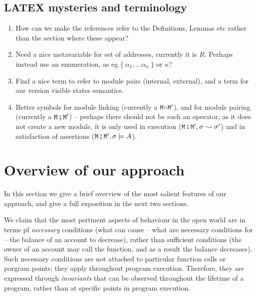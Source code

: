  \subsection*{LATEX mysteries and terminology}
 \begin{enumerate}
 \item
 How can we make the references refer to the Definitions, Lemmas etc rather than the section where these appear?
 \item
 Need a nice metavariable for set of addresses, currently it is $R$. Perhaps instead use an enumeration, as eg $\{ \ \alpha_1,...\alpha_n\ \} $
 or $\kappa$?
\item
Find a nice term  to refer to module pairs  (internal, external), and a term for 
our version visible states semantics.
\item
Better symbols for module linking (currently a ${\mbox{\tt{\ensuremath{{\mbox{\tt{M}}}}}}}\!\circ\!{\mbox{\tt{\ensuremath{{\mbox{\tt{M}}}}}}}'$), and 
for module pairing (currently a ${\mbox{\tt{\ensuremath{{\mbox{\tt{M}}}}}}}\fatsemi {\mbox{\tt{\ensuremath{{\mbox{\tt{M}}}}}}}'$) -- perhaps there should not be such an operator, as
it does not create a new module, it is only used in execution (${\mbox{\tt{\ensuremath{{\mbox{\tt{M}}}}}}}\fatsemi {\mbox{\tt{\ensuremath{{\mbox{\tt{M}}}}}}}', \sigma \leadsto \sigma'$) 
and in satisfaction of assertions (${\mbox{\tt{\ensuremath{{\mbox{\tt{M}}}}}}}\fatsemi {\mbox{\tt{\ensuremath{{\mbox{\tt{M}}}}}}}', \sigma\models A$).
 \end{enumerate} 


\section{Overview of our approach}

In this section we give a brief overview of the most salient features of our approach, and give a full exposition in the next two sections.


We claim that the most pertinent aspects of behaviour in the open world 
are   in terms pf  {\em necessary} conditions (\eg what can cause -- what are necessary conditions for --
 the balance of an account to decrease), rather than sufficient conditions (\eg the owner of an account may 
 call the  function, and as a result the balance decreases). 
Such necessary conditions are not attached to particular function calls or porgram points; they apply
throughout program execution. 
Therefore, they are expressed through  {\em invariants} that can be observed throughout the lifetime of a program, rather than at specific points in program execution.

